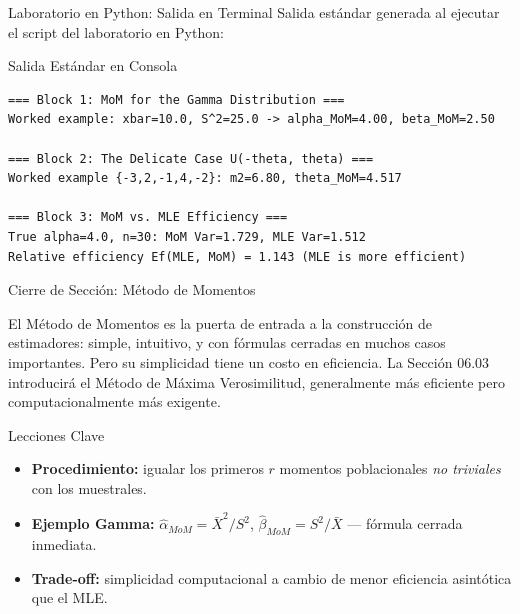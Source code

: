 \documentclass[10pt, aspectratio=169]{beamer}
\begin{document}
\begin{frame}[fragile]{Laboratorio en Python: Salida en Terminal}
  \scriptsize
  Salida estándar generada al ejecutar el script del laboratorio en Python:
  \vspace{0.02cm}
  \begin{block}{Salida Estándar en Consola}
    \fontsize{4pt}{5pt}\selectfont
    \begin{verbatim}
=== Block 1: MoM for the Gamma Distribution ===
Worked example: xbar=10.0, S^2=25.0 -> alpha_MoM=4.00, beta_MoM=2.50

=== Block 2: The Delicate Case U(-theta, theta) ===
Worked example {-3,2,-1,4,-2}: m2=6.80, theta_MoM=4.517

=== Block 3: MoM vs. MLE Efficiency ===
True alpha=4.0, n=30: MoM Var=1.729, MLE Var=1.512
Relative efficiency Ef(MLE, MoM) = 1.143 (MLE is more efficient)
    \end{verbatim}
  \end{block}
\end{frame}






\begin{frame}{Cierre de Sección: Método de Momentos}
  \begin{reflexion}
    El Método de Momentos es la puerta de entrada a la construcción de estimadores: simple, intuitivo, y con fórmulas cerradas en muchos casos importantes. Pero su simplicidad tiene un costo en eficiencia. La Sección 06.03 introducirá el Método de Máxima Verosimilitud, generalmente más eficiente pero computacionalmente más exigente.
  \end{reflexion}

  \vspace{0.2cm}
  \pause
  \begin{block}{Lecciones Clave}
    \begin{itemize}\itemsep=0.08cm
      \item \textbf{Procedimiento:} igualar los primeros $r$ momentos poblacionales \emph{no triviales} con los muestrales.
      \item \textbf{Ejemplo Gamma:} $\hat\alpha_{MoM}=\bar X^2/S^2$, $\hat\beta_{MoM}=S^2/\bar X$ --- fórmula cerrada inmediata.
      \item \textbf{Trade-off:} simplicidad computacional a cambio de menor eficiencia asintótica que el MLE.
    \end{itemize}
  \end{block}
\end{frame}
\end{document}
